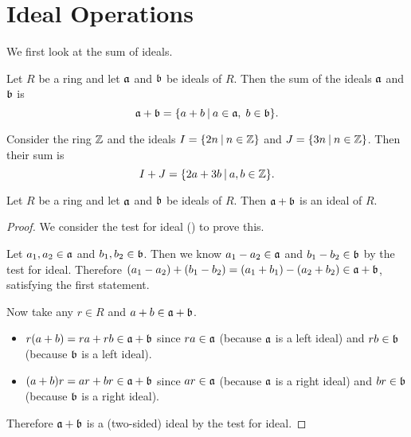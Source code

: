 \section{Ideal Operations}
We first look at the sum of ideals.
\begin{definition}
    Let $R$ be a ring and let $\mathfrak{a}$ and $\mathfrak{b}$ be ideals of $R$. Then the sum of the ideals $\mathfrak{a}$ and $\mathfrak{b}$ is
    \[
        \ideal{a} + \ideal{b} = \{a + b \vert a\in\ideal{a},\;b\in\ideal{b}\}.
    \]
\end{definition}
\begin{example}
    Consider the ring $\mathbb{Z}$ and the ideals $I = \{2n \vert n \in \Z\}$ and $J = \{3n \vert n \in \Z\}$. Then their sum is
    \[
        I + J = \{2a + 3b \vert a,b \in \Z\}.
    \]
\end{example}
\begin{proposition}
    Let $R$ be a ring and let $\mathfrak{a}$ and $\mathfrak{b}$ be ideals of $R$. Then $\mathfrak{a} + \mathfrak{b}$ is an ideal of $R$.
\end{proposition}
\begin{proof}
    We consider the test for ideal () to prove this.

    Let $a_1, a_2 \in \mathfrak{a}$ and $b_1, b_2 \in \mathfrak{b}$. Then we know $a_1 - a_2 \in \mathfrak{a}$ and $b_1 - b_2 \in \mathfrak{b}$ by the test for ideal. Therefore $(a_1 - a_2) + (b_1 - b_2) = (a_1 + b_1) - (a_2 + b_2) \in \mathfrak{a} + \mathfrak{b}$, satisfying the first statement.

    Now take any $r \in R$ and $a+b \in \mathfrak{a}+\mathfrak{b}$.
    \begin{itemize}
        \item $r(a+b) = ra + rb \in \mathfrak{a}+\mathfrak{b}$ since $ra \in \mathfrak{a}$ (because $\mathfrak{a}$ is a left ideal) and $rb \in \mathfrak{b}$ (because $\mathfrak{b}$ is a left ideal).
        \item $(a+b)r = ar + br \in \mathfrak{a}+\mathfrak{b}$ since $ar \in \mathfrak{a}$ (because $\mathfrak{a}$ is a right ideal) and $br \in \mathfrak{b}$ (because $\mathfrak{b}$ is a right ideal).
    \end{itemize}
    Therefore $\mathfrak{a} + \mathfrak{b}$ is a (two-sided) ideal by the test for ideal.
\end{proof}

\newpage

